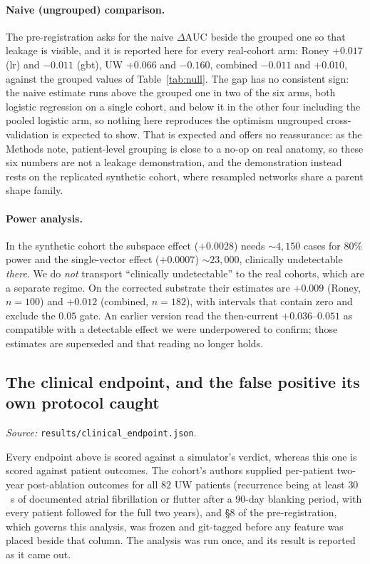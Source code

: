 \documentclass[11pt]{article}
\theoremstyle{definition}
\newcommand{\dAUC}{\Delta\mathrm{AUC}}
\newcommand{\code}[1]{\texttt{#1}}
\begin{document}
\paragraph{Naive (ungrouped) comparison.} The pre-registration asks for the naive
$\dAUC$ beside the grouped one so that leakage is visible, and it is reported
here for every real-cohort arm: Roney $+0.017$ (lr) and $-0.011$ (gbt), UW
$+0.066$ and $-0.160$, combined $-0.011$ and $+0.010$, against the grouped
values of Table~\ref{tab:null}. The gap has no consistent sign: the naive
estimate runs above the grouped one in two of the six arms, both logistic
regression on a single cohort, and below it in the other four including the
pooled logistic arm, so nothing here reproduces the optimism ungrouped
cross-validation is expected to show. That is expected and offers no reassurance:
as the Methods note, patient-level grouping is close to a no-op on real anatomy,
so these six numbers are not a leakage demonstration, and the demonstration
instead rests on the replicated synthetic cohort, where resampled networks share
a parent shape family.

\paragraph{Power analysis.} In the synthetic cohort the subspace effect
($+0.0028$) needs $\sim\!4{,}150$ cases for $80\%$ power and the single-vector
effect ($+0.0007$) $\sim\!23{,}000$, clinically undetectable \emph{there}. We do
\emph{not} transport ``clinically undetectable'' to the real cohorts, which are a
separate regime. On the corrected substrate their estimates are $+0.009$ (Roney,
$n=100$) and $+0.012$ (combined, $n=182$), with intervals that contain zero and
exclude the $0.05$ gate. An earlier version read the then-current
$+0.036$--$0.051$ as compatible with a detectable effect we were underpowered to
confirm; those estimates are superseded and that reading no longer holds.

\subsection{The clinical endpoint, and the false positive its own protocol caught}
\label{sec:clinical}
\noindent\emph{Source:}
\code{results/\allowbreak clinical\allowbreak\_endpoint.json}.

Every endpoint above is scored against a simulator's verdict, whereas this one is
scored against patient outcomes. The cohort's authors supplied per-patient
two-year post-ablation outcomes for all $82$ UW patients (recurrence being at
least $30$~s of documented atrial fibrillation or flutter after a $90$-day
blanking period, with every patient followed for the full two years), and \S8 of the
pre-registration, which governs this analysis, was frozen and git-tagged before
any feature was placed beside that column. The analysis was run once, and its
result is reported as it came out.
\end{document}
